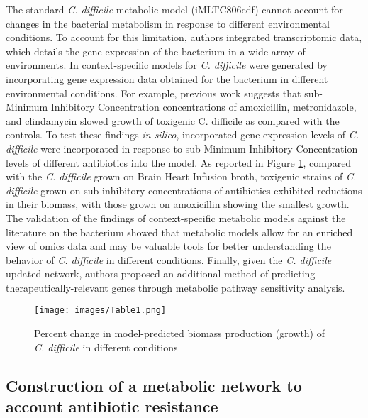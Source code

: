 \documentclass{article}
\begin{document}
The standard {\it C. difficile} metabolic model (iMLTC806cdf) cannot account for changes in the bacterial metabolism in response to different environmental conditions. To account for this limitation, authors integrated transcriptomic data, which details the gene expression of the bacterium in a wide array of environments. In \cite{Kashaf} context-specific models for {\it C. difficile} were generated by incorporating gene expression data obtained for the bacterium in different environmental conditions. For example, previous work suggests that sub-Minimum Inhibitory Concentration concentrations of amoxicillin, metronidazole, and clindamycin slowed growth of toxigenic C. difficile as compared with the controls. To test these findings {\it in silico}, incorporated gene expression levels of {\it C. difficile} were incorporated in response to sub-Minimum Inhibitory Concentration levels of different antibiotics into the model. As reported in Figure \ref{fig:table1}, compared with the {\it C. difficile} grown on Brain Heart Infusion broth, toxigenic strains of {\it C. difficile} grown on sub-inhibitory concentrations of antibiotics exhibited reductions in their biomass, with those grown on amoxicillin showing the smallest growth. The validation of the findings of context-specific metabolic models against the literature on the bacterium showed that metabolic models allow for an enriched view of omics data and may be valuable tools for better understanding the behavior of {\it C. difficile} in different conditions. Finally, given the {\it C. difficile} updated network, authors proposed an additional method of predicting therapeutically-relevant genes through metabolic pathway sensitivity analysis.

\begin{figure}
\centering
\texttt{[image: images/Table1.png]}
\caption{\label{fig:table1} Percent change in model-predicted biomass production (growth) of {\it C. difficile} in different conditions}
\end{figure}

\subsection{Construction of a metabolic network to account antibiotic resistance}
\end{document}
